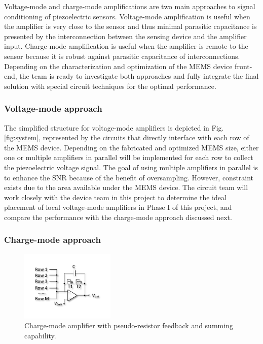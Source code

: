 Voltage-mode and charge-mode amplifications are two main approaches to signal conditioning of piezoelectric sensors. Voltage-mode amplification is useful when the amplifier is very close to the sensor and thus minimal parasitic capacitance is presented by the interconnection between the sensing device and the amplifier input. Charge-mode amplification is useful when the amplifier is remote to the sensor because it is robust against parasitic capacitance of interconnections. Depending on the characterization and optimization of the MEMS device front-end, the team is ready to investigate both approaches and fully integrate the final solution with special circuit techniques for the optimal performance. 

\subsubsection{Voltage-mode approach}

The simplified structure for voltage-mode amplifiers is depicted in Fig. \ref{fig:system}, represented by the circuits that directly interface with each row of the MEMS device. Depending on the fabricated and optimized MEMS size, either one or multiple amplifiers in parallel will be implemented for each row to collect the piezoelectric voltage signal. The goal of using multiple amplifiers in parallel is to enhance the SNR because of the benefit of oversampling. However, constraint exists due to the area available under the MEMS device. The circuit team will work closely with the device team in this project to determine the ideal placement of local voltage-mode amplifiers in Phase I of this project, and compare the performance with the charge-mode approach discussed next.  

\subsubsection{Charge-mode approach}

\begin{figure}
\centering
\includegraphics[width=0.4\textwidth]{cmos}
\caption{Charge-mode amplifier with pseudo-resistor feedback and summing capability.}
\label{fig:cmos}
\end{figure}

